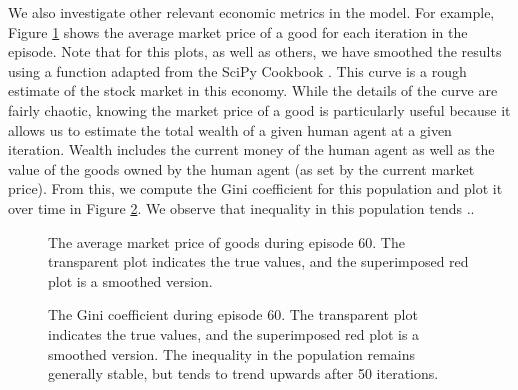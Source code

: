 \documentclass[twoside,twocolumn]{article}
\begin{document}
We also investigate other relevant economic metrics in the model. For example, Figure \ref{plt:late-stockmarket} shows the average market price of a good for each iteration in the episode. Note that for this plots, as well as others, we have smoothed the results using a function adapted from the SciPy Cookbook \cite{scipy}. This curve is a rough estimate of the stock market in this economy. While the details of the curve are fairly chaotic, knowing the market price of a good is particularly useful because it allows us to estimate the total wealth of a given human agent at a given iteration. Wealth includes the current money of the human agent as well as the value of the goods owned by the human agent (as set by the current market price). From this, we compute the Gini coefficient for this population and plot it over time in Figure \ref{plt:late-gini}. We observe that inequality in this population tends ..

\begin{figure}[h]
  \caption{The average market price of goods during episode 60. The transparent plot indicates the true values, and the superimposed red plot is a smoothed version.}
  \label{plt:late-stockmarket}
\end{figure}


\begin{figure}[h]
  \caption{The Gini coefficient during episode 60. The transparent plot indicates the true values, and the superimposed red plot is a smoothed version. The inequality in the population remains generally stable, but tends to trend upwards after 50 iterations.}
  \label{plt:late-gini}
\end{figure}
\end{document}
